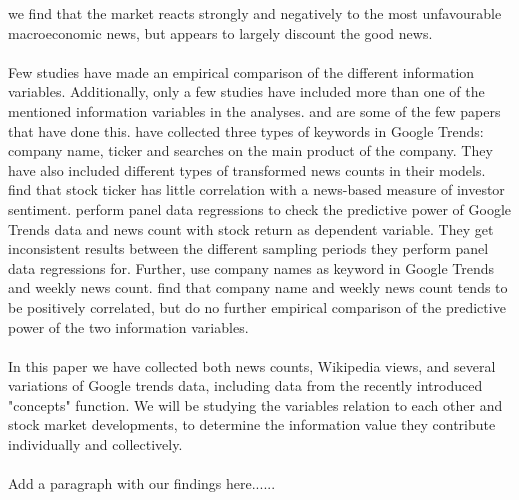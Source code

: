we find that the market reacts strongly and negatively to the most unfavourable macroeconomic news, but appears to largely discount the good news.
\\\\
Few studies have made an empirical comparison of the different information variables. Additionally, only a few studies have included more than one of the mentioned information variables in the analyses. \cite{vlastakis} and \cite{engelberg} are some of the few papers that have done this. \cite{engelberg} have collected three types of keywords in Google Trends: company name, ticker and searches on the main product of the company. They have also included different types of transformed news counts in their models. \cite{engelberg} find that stock ticker has little correlation with a news-based measure of investor sentiment. \cite{engelberg} perform panel data regressions to check the predictive power of Google Trends data and news count with stock return as dependent variable. They get inconsistent results between the different sampling periods they perform panel data regressions for. Further, \cite{vlastakis} use company names as keyword in Google Trends and weekly news count. \cite{vlastakis} find that company name and weekly news count tends to be positively correlated, but do no further empirical comparison of the predictive power of the two information variables. 
\\\\
In this paper we have collected both news counts, Wikipedia views, and several variations of Google trends data, including data from the recently introduced "concepts" function. We will be studying the variables relation to each other and stock market developments, to determine the information value they contribute individually and collectively.
\\\\

{\color{red}Add a paragraph with our findings here......}
\cleardoublepage
 


\cleardoublepage